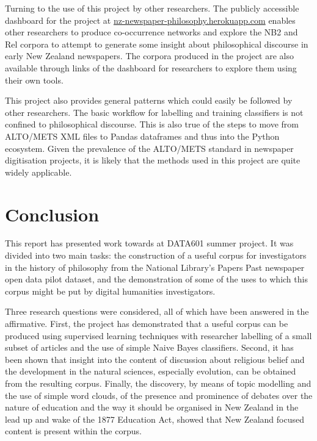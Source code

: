 \documentclass{article}
\begin{document}
Turning to the use of this project by other researchers. The publicly accessible dashboard for the project at \url{nz-newspaper-philosophy.herokuapp.com} enables other researchers to produce co-occurrence networks and explore the NB2 and Rel corpora to attempt to generate some insight about philosophical discourse in early New Zealand newspapers. The corpora produced in the project are also available through links of the dashboard for researchers to explore them using their own tools.

This project also provides general patterns which could easily be followed by other researchers. The basic workflow for labelling and training classifiers is not confined to philosophical discourse. This is also true of the steps to move from ALTO/METS XML files to Pandas dataframes and thus into the Python ecosystem. Given the prevalence of the ALTO/METS standard in newspaper digitisation projects, it is likely that the methods used in this project are quite widely applicable.

\section*{Conclusion}

This report has presented work towards at DATA601 summer project. It was divided into two main tasks: the construction of a useful corpus for investigators in the history of philosophy from the National Library's Papers Past newspaper open data pilot dataset, and the demonstration of some of the uses to which this corpus might be put by digital humanities investigators.

Three research questions were considered, all of which have been answered in the affirmative. First, the project has demonstrated that a useful corpus can be produced using supervised learning techniques with researcher labelling of a small subset of articles and the use of simple Naive Bayes classifiers. Second, it has been shown that insight into the content of discussion about religious belief and the development in the natural sciences, especially evolution, can be obtained from the resulting corpus. %
Finally, the discovery, by means of topic modelling and the use of simple word clouds, of the presence and prominence of debates over the nature of education and the way it should be organised in New Zealand in the lead up and wake of the 1877 Education Act, showed that New Zealand focused content is present within the corpus.
\end{document}
